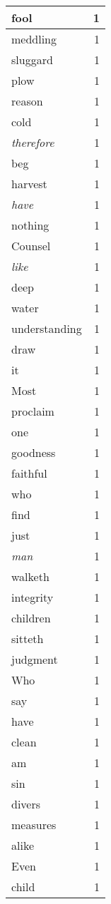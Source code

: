 \begin{center}
\begin{longtable}{l|r}
fool & 1\\ \hline 
meddling & 1\\ \hline 
sluggard & 1\\ \hline 
plow & 1\\ \hline 
reason & 1\\ \hline 
cold & 1\\ \hline 
\emph{therefore} & 1\\ \hline 
beg & 1\\ \hline 
harvest & 1\\ \hline 
\emph{have} & 1\\ \hline 
nothing & 1\\ \hline 
Counsel & 1\\ \hline 
\emph{like} & 1\\ \hline 
deep & 1\\ \hline 
water & 1\\ \hline 
understanding & 1\\ \hline 
draw & 1\\ \hline 
it & 1\\ \hline 
Most & 1\\ \hline 
proclaim & 1\\ \hline 
one & 1\\ \hline 
goodness & 1\\ \hline 
faithful & 1\\ \hline 
who & 1\\ \hline 
find & 1\\ \hline 
just & 1\\ \hline 
\emph{man} & 1\\ \hline 
walketh & 1\\ \hline 
integrity & 1\\ \hline 
children & 1\\ \hline 
sitteth & 1\\ \hline 
judgment & 1\\ \hline 
Who & 1\\ \hline 
say & 1\\ \hline 
have & 1\\ \hline 
clean & 1\\ \hline 
am & 1\\ \hline 
sin & 1\\ \hline 
divers & 1\\ \hline 
measures & 1\\ \hline 
alike & 1\\ \hline 
Even & 1\\ \hline 
child & 1\\ \hline 

\end{longtable}
\end{center}
